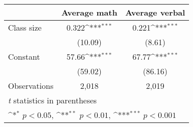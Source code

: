 {
\def\sym#1{\ifmmode^{#1}\else\(^{#1}\)\fi}
\begin{tabular}{l*{2}{c}}
\hline\hline
          &\multicolumn{1}{c}{Average math}&\multicolumn{1}{c}{Average verbal}\\
\hline
Class size&    0.322\sym{***}&    0.221\sym{***}\\
          &  (10.09)         &   (8.61)         \\
Constant  &    57.66\sym{***}&    67.77\sym{***}\\
          &  (59.02)         &  (86.16)         \\
\hline
Observations&    2,018         &    2,019         \\
\hline\hline
\multicolumn{3}{l}{\footnotesize \textit{t} statistics in parentheses}\\
\multicolumn{3}{l}{\footnotesize \sym{*} \(p<0.05\), \sym{**} \(p<0.01\), \sym{***} \(p<0.001\)}\\
\end{tabular}
}
